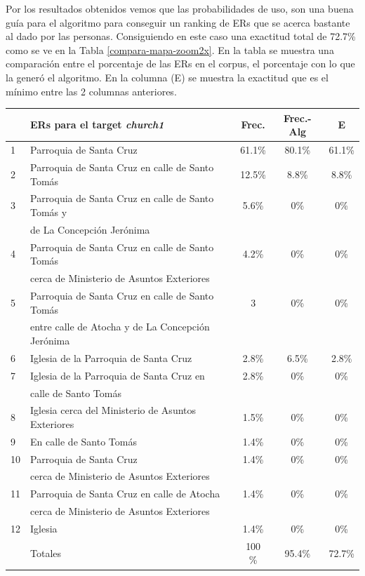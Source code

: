 Por los resultados obtenidos vemos que las probabilidades de uso, son una buena gu\'ia para el algoritmo para conseguir un ranking de ERs que se acerca bastante al dado por las personas. Consiguiendo en este caso una exactitud total de 72.7\% como se ve en la Tabla \ref{compara-mapa-zoom2x}. En la tabla se muestra una comparaci\'on entre el porcentaje de las ERs en el corpus, el porcentaje con lo que la gener\'o el algoritmo. En la columna (E) se muestra la exactitud que es el m\'inimo entre las 2 columnas anteriores.  

\begin{table}[h]
{\footnotesize
\begin{center}
\begin{tabular}{|l|l|c|c|c|}
\hline
&ERs para el target {\it church1} 					       &  Frec. & Frec.-Alg &E\\ \hline \hline
1&Parroquia de Santa Cruz        						   &	61.1\%  &   80.1\% &61.1\% \\ \hline
2&Parroquia de Santa Cruz en calle de Santo Tom\'as        &    12.5\%	&  8.8\% &8.8\% \\ \hline
3&Parroquia de Santa Cruz en calle de Santo Tom\'as y      &    5.6\%   & 0\% &0\% \\
&de La Concepci\'on Jer\'onima                             &            &  &\\ \hline
4&Parroquia de Santa Cruz en calle de Santo Tom\'as        &     4.2\%  & 0\% &0\% \\
&cerca de Ministerio de Asuntos Exteriores                 &            & &\\  \hline
5&Parroquia de Santa Cruz en calle de Santo Tom\'as        &	3       &	0\%	&0\% \\
&entre calle de Atocha y de La Concepci\'on Jer\'onima     &	        &	&		 \\  \hline
6&Iglesia de la Parroquia de Santa Cruz			           &	2.8\%	&6.5\%&2.8\% \\  \hline
7&Iglesia de la Parroquia de Santa Cruz	en      	       &	2.8\%	& 0\% &0\% \\  
&calle de Santo Tom\'as									   &	    	&	  &  \\ \hline
8&Iglesia cerca del Ministerio de Asuntos Exteriores       &	1.5\%	    &0\% & 0\% \\  \hline
9&En calle de Santo Tom\'as                                &   1.4\%    &0\% &0\% \\  \hline

10&Parroquia de Santa Cruz  				               &    1.4\%	&0\% &0\% \\  
&cerca de Ministerio de Asuntos Exteriores		           &	  		&&\\  \hline
11&Parroquia de Santa Cruz en calle de Atocha  		       &	1.4\%	&0\%& 0\% \\  
&cerca de Ministerio de Asuntos Exteriores		   	       &	    	&&\\  \hline
12&Iglesia						                           &    1.4\%	& 0\%& 0\% \\  \hline \hline
&Totales&                                                    	100 \%     &95.4\%	 &72.7\% \\  \hline


\end{tabular}
\end{center}}
\end{table}
